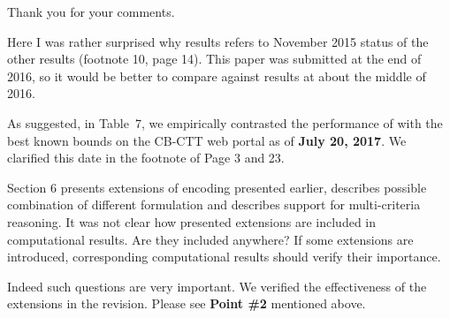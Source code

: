 \documentclass[a4j]{article}
\begin{document}
Thank you for your comments.

\begin{it}\color{blue}
Here I was rather surprised why results refers to November 2015 status
of the other results (footnote 10, page 14). This paper was submitted
at the end of 2016, so it would be better to compare against results
at about the middle of 2016.
\end{it}

As suggested, in Table~7, 
we empirically contrasted the performance of {\asap} with the best
known bounds on the CB-CTT web portal as of \textbf{July 20, 2017}.
We clarified this date in the footnote of Page 3 and 23.

\begin{it}\color{blue}
Section 6 presents extensions of encoding presented earlier, describes
possible combination of different formulation and describes support
for multi-criteria reasoning. It was not clear how presented
extensions are included in computational results. Are they included
anywhere? If some extensions are introduced, corresponding
computational results should verify their importance.
\end{it}

Indeed such questions are very important.
We verified the effectiveness of the extensions in the revision.
Please see \textbf{Point \#2} mentioned above.
\end{document}
